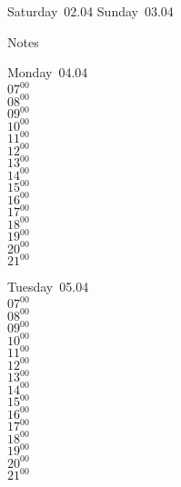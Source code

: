 \documentclass[11pt,a4paper]{book}\usepackage[]{graphicx}\usepackage[]{color}
\begin{document}
\begin{weekendbox}
  Saturday~02.04
  \tcblower
  Sunday~03.04
\end{weekendbox} %
\begin{notebox}
  Notes
\end{notebox}
\clearpage
\begin{headerbox}
\end{headerbox}
\begin{weekdaybox}
  Monday~04.04\\
  { 
  \vfill
  $07^{00}$\\
$08^{00}$\\
$09^{00}$\\
$10^{00}$\\
$11^{00}$\\
$12^{00}$\\
$13^{00}$\\
$14^{00}$\\
$15^{00}$\\
$16^{00}$\\
$17^{00}$\\
$18^{00}$\\
$19^{00}$\\
$20^{00}$\\
$21^{00}$\\
  }
\end{weekdaybox}
\begin{weekdaybox}
  Tuesday~05.04\\
  { 
  \vfill
  $07^{00}$\\
$08^{00}$\\
$09^{00}$\\
$10^{00}$\\
$11^{00}$\\
$12^{00}$\\
$13^{00}$\\
$14^{00}$\\
$15^{00}$\\
$16^{00}$\\
$17^{00}$\\
$18^{00}$\\
$19^{00}$\\
$20^{00}$\\
$21^{00}$\\
  }
\end{weekdaybox}
\end{document}
